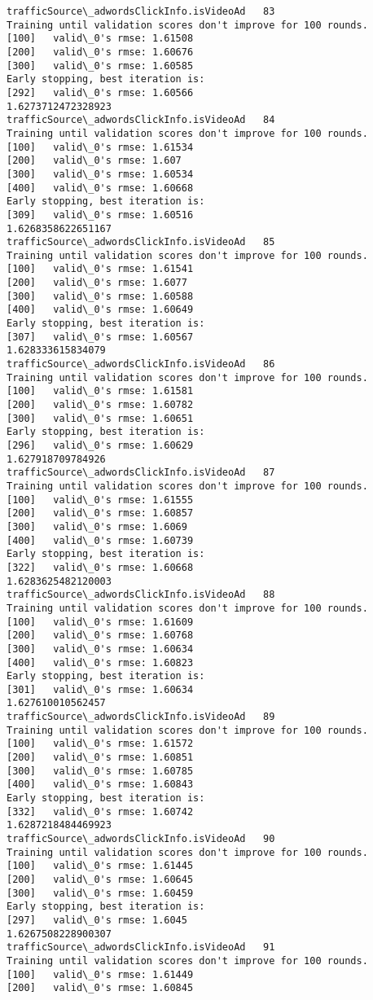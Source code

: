 \documentclass[11pt]{article}
\begin{document}
\begin{Verbatim}[commandchars=\\\{\}]
trafficSource\_adwordsClickInfo.isVideoAd   83
Training until validation scores don't improve for 100 rounds.
[100]	valid\_0's rmse: 1.61508
[200]	valid\_0's rmse: 1.60676
[300]	valid\_0's rmse: 1.60585
Early stopping, best iteration is:
[292]	valid\_0's rmse: 1.60566
1.6273712472328923
trafficSource\_adwordsClickInfo.isVideoAd   84
Training until validation scores don't improve for 100 rounds.
[100]	valid\_0's rmse: 1.61534
[200]	valid\_0's rmse: 1.607
[300]	valid\_0's rmse: 1.60534
[400]	valid\_0's rmse: 1.60668
Early stopping, best iteration is:
[309]	valid\_0's rmse: 1.60516
1.6268358622651167
trafficSource\_adwordsClickInfo.isVideoAd   85
Training until validation scores don't improve for 100 rounds.
[100]	valid\_0's rmse: 1.61541
[200]	valid\_0's rmse: 1.6077
[300]	valid\_0's rmse: 1.60588
[400]	valid\_0's rmse: 1.60649
Early stopping, best iteration is:
[307]	valid\_0's rmse: 1.60567
1.628333615834079
trafficSource\_adwordsClickInfo.isVideoAd   86
Training until validation scores don't improve for 100 rounds.
[100]	valid\_0's rmse: 1.61581
[200]	valid\_0's rmse: 1.60782
[300]	valid\_0's rmse: 1.60651
Early stopping, best iteration is:
[296]	valid\_0's rmse: 1.60629
1.627918709784926
trafficSource\_adwordsClickInfo.isVideoAd   87
Training until validation scores don't improve for 100 rounds.
[100]	valid\_0's rmse: 1.61555
[200]	valid\_0's rmse: 1.60857
[300]	valid\_0's rmse: 1.6069
[400]	valid\_0's rmse: 1.60739
Early stopping, best iteration is:
[322]	valid\_0's rmse: 1.60668
1.6283625482120003
trafficSource\_adwordsClickInfo.isVideoAd   88
Training until validation scores don't improve for 100 rounds.
[100]	valid\_0's rmse: 1.61609
[200]	valid\_0's rmse: 1.60768
[300]	valid\_0's rmse: 1.60634
[400]	valid\_0's rmse: 1.60823
Early stopping, best iteration is:
[301]	valid\_0's rmse: 1.60634
1.627610010562457
trafficSource\_adwordsClickInfo.isVideoAd   89
Training until validation scores don't improve for 100 rounds.
[100]	valid\_0's rmse: 1.61572
[200]	valid\_0's rmse: 1.60851
[300]	valid\_0's rmse: 1.60785
[400]	valid\_0's rmse: 1.60843
Early stopping, best iteration is:
[332]	valid\_0's rmse: 1.60742
1.6287218484469923
trafficSource\_adwordsClickInfo.isVideoAd   90
Training until validation scores don't improve for 100 rounds.
[100]	valid\_0's rmse: 1.61445
[200]	valid\_0's rmse: 1.60645
[300]	valid\_0's rmse: 1.60459
Early stopping, best iteration is:
[297]	valid\_0's rmse: 1.6045
1.6267508228900307
trafficSource\_adwordsClickInfo.isVideoAd   91
Training until validation scores don't improve for 100 rounds.
[100]	valid\_0's rmse: 1.61449
[200]	valid\_0's rmse: 1.60845

\end{Verbatim}
\end{document}
